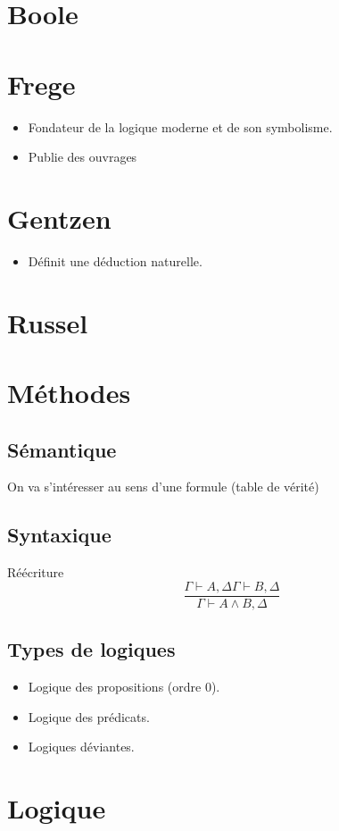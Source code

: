 \documentclass[10pt,a4paper]{article}
\begin{document}
\section{Boole}
\section{Frege}
\begin{itemize}
\item Fondateur de la logique moderne et de son symbolisme.
\item Publie des ouvrages 
\end{itemize}
\section{Gentzen}
\begin{itemize}
\item Définit une déduction naturelle.
\end{itemize}
\section{Russel}
\section{Méthodes}
\subsection{Sémantique}
On va s’intéresser au sens d'une formule (table de vérité)
\subsection{Syntaxique}
Réécriture\\
\[ \dfrac{\Gamma \vdash A,\Delta \Gamma\vdash B,\Delta}{\Gamma \vdash A\wedge B, \Delta} \]
\subsection{Types de logiques}
\begin{itemize}
\item Logique des propositions (ordre 0).
\item Logique des prédicats.
\item Logiques déviantes.
\end{itemize}
\section{Logique}
\end{document}
